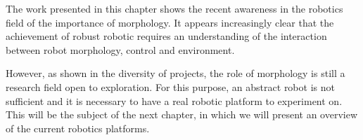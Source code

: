 The work presented in this chapter shows the recent awareness in the robotics field of the importance of morphology. It appears increasingly clear that the achievement of robust robotic requires an understanding of the interaction between robot morphology, control and environment.

However, as shown in the diversity of projects, the role of morphology is still a research field open to exploration. For this purpose, an abstract robot is not sufficient and it is necessary to have a real robotic platform to experiment on. This will be the subject of the next chapter, in which we will present an overview of the current robotics platforms.


